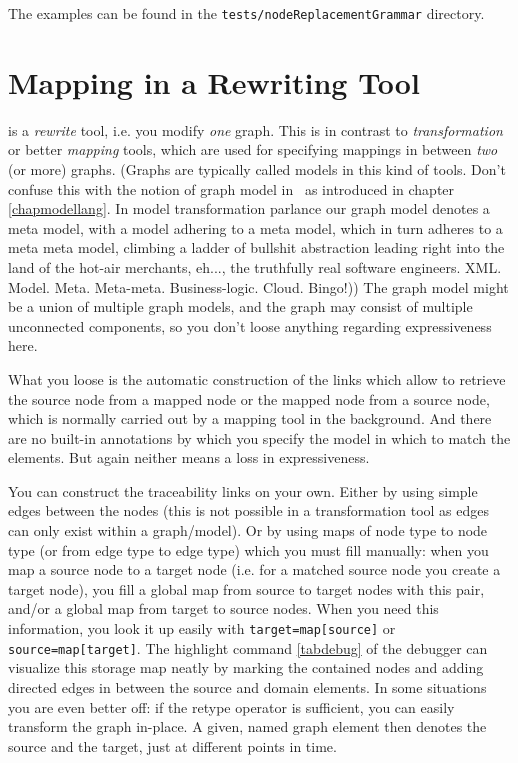 The examples can be found in the \texttt{tests/nodeReplacementGrammar} directory.


\section{Mapping in a Rewriting Tool}\label{sec:transfo}
\GrG{} is a \emph{rewrite} tool, i.e. you modify \emph{one} graph.
This is in contrast to \emph{transformation} or better \emph{mapping} tools, which are used for specifying mappings in between \emph{two} (or more) graphs. (Graphs are typically called models in this kind of tools. Don't confuse this with the notion of graph model in \GrG\ as introduced in chapter \ref{chapmodellang}. In model transformation parlance our graph model denotes a meta model, with a model adhering to a meta model, which in turn adheres to a meta meta model, climbing a ladder of bullshit abstraction leading right into the land of the hot-air merchants, eh..., the truthfully real software engineers. XML. Model. Meta. Meta-meta. Business-logic. Cloud. Bingo!))
The graph model might be a union of multiple graph models, and the graph may consist of multiple unconnected components, so you don't loose anything regarding expressiveness here.

What you loose is the automatic construction of the  links which allow to retrieve the source node from a mapped node or the mapped node from a source node, which is normally carried out by a mapping tool in the background.
And there are no built-in annotations by which you specify the model in which to match the elements.
But again neither means a loss in expressiveness.

You can construct the traceability links on your own.
Either by using simple edges between the nodes (this is not possible in a transformation tool as edges can only exist within a graph/model).
Or by using maps of node type to node type (or from edge type to edge type) which you must fill manually:
when you map a source node to a target node (i.e. for a matched source node you create a target node), you fill a global map from source to target nodes with this pair, and/or a global map from target to source nodes.
When you need this information, you look it up easily with \texttt{target=map[source]} or \texttt{source=map[target]}.
The highlight command \ref{tabdebug} of the debugger can visualize this storage map neatly by marking the contained nodes and adding directed edges in between the source and domain elements.
In some situations you are even better off: if the retype operator is sufficient, you can easily transform the graph in-place. A given, named graph element then denotes the source and the target, just at different points in time.

